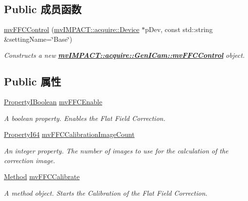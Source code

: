 \subsection*{Public 成员函数}
\begin{DoxyCompactItemize}
\item 
\hyperlink{classmv_i_m_p_a_c_t_1_1acquire_1_1_gen_i_cam_1_1mv_f_f_c_control_a0b9e5dbf8f579e20c4e5531e601fb80e}{mv\+F\+F\+C\+Control} (\hyperlink{classmv_i_m_p_a_c_t_1_1acquire_1_1_device}{mv\+I\+M\+P\+A\+C\+T\+::acquire\+::\+Device} $\ast$p\+Dev, const std\+::string \&setting\+Name=\char`\"{}Base\char`\"{})
\begin{DoxyCompactList}\small\item\em Constructs a new {\bfseries \hyperlink{classmv_i_m_p_a_c_t_1_1acquire_1_1_gen_i_cam_1_1mv_f_f_c_control}{mv\+I\+M\+P\+A\+C\+T\+::acquire\+::\+Gen\+I\+Cam\+::mv\+F\+F\+C\+Control}} object. \end{DoxyCompactList}\end{DoxyCompactItemize}
\subsection*{Public 属性}
\begin{DoxyCompactItemize}
\item 
\hyperlink{group___common_interface_ga44f9437e24b21b6c93da9039ec6786aa}{Property\+I\+Boolean} \hyperlink{classmv_i_m_p_a_c_t_1_1acquire_1_1_gen_i_cam_1_1mv_f_f_c_control_af8c4a2cfcdb4cf53fd423a28d19193f9}{mv\+F\+F\+C\+Enable}
\begin{DoxyCompactList}\small\item\em A boolean property. Enables the Flat Field Correction. \end{DoxyCompactList}\item 
\hyperlink{group___common_interface_ga81749b2696755513663492664a18a893}{Property\+I64} \hyperlink{classmv_i_m_p_a_c_t_1_1acquire_1_1_gen_i_cam_1_1mv_f_f_c_control_af6d11f50a9987c5303433a0602d4fd7e}{mv\+F\+F\+C\+Calibration\+Image\+Count}
\begin{DoxyCompactList}\small\item\em An integer property. The number of images to use for the calculation of the correction image. \end{DoxyCompactList}\item 
\hyperlink{classmv_i_m_p_a_c_t_1_1acquire_1_1_method}{Method} \hyperlink{classmv_i_m_p_a_c_t_1_1acquire_1_1_gen_i_cam_1_1mv_f_f_c_control_a75cafe86997b7851962e8d862101f003}{mv\+F\+F\+C\+Calibrate}
\begin{DoxyCompactList}\small\item\em A method object. Starts the Calibration of the Flat Field Correction. \end{DoxyCompactList}\end{DoxyCompactItemize}
